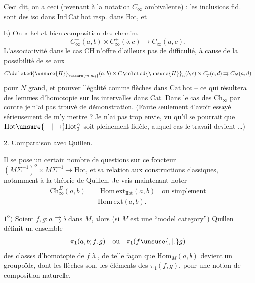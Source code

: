 Ceci dit, on a ceci (revenant à la notation $C_{\infty}$ ambivalente) :  les inclusions  fid.
sont des iso dans $\mathrm{Ind}\,\mathrm{Cat}\,\mathrm{hot}$ resp. dans $\mathrm{Hot}$, et

b) On a bel et bien  composition des chemins
\[
C_{\infty}^{-}(a,b)\times C_{\infty}^{+}(b,c)\longrightarrow C_{\infty}(a,c).
\]
L'\uline{associativité} dans le cas  $\mathrm{CH}$ n'offre d'ailleurs pas de difficulté, à cause de la possibilité de se   aux
\[
C\deleted{\unsure{H}}_{\unsure{m|m_1}}(a,b)\times C\deleted{\unsure{H}}_n(b,c)\times C_p(c,d)\rightrightarrows C_N(a,d)
\]
pour $N$ grand, et prouver l'égalité  comme flèches dans $\mathrm{Cat}\ \mathrm{hot}$ -- ce qui résultera des lemmes d'homotopie sur les intervalles dans $\mathrm{Cat}$. Dans le cas des $\mathrm{Ch}_{\infty}$ par contre je n'ai pas trouvé de démonstration. (Faute seulement d'avoir essayé sérieusement de m'y mettre ? Je n'ai pas trop envie, vu qu'il se pourrait que $\mathrm{Hot}\unsure{\text{---}|\to}\mathrm{Hot}_0^{\wedge}$ soit pleinement fidèle, auquel cas le travail devient  \ldots)

2. \uline{Comparaison avec} \uline{Quillen}.

 Il se pose un certain nombre de questions sur ce foncteur $(M\Sigma^{-1})^o\times M\Sigma^{-1}\longrightarrow\mathrm{Hot}$, et sa relation aux constructions classiques, notamment à la théorie de Quillen. Je vais maintenant noter
\[
\begin{aligned}
\mathrm{Ch}_{\infty}^{\Sigma}(a,b)&=\mathrm{Hom}\,\mathrm{ext}_{\mathrm{Hot}}(a,b)\quad\text{ou simplement}\\
&\quad\mathrm{Hom}\,\mathrm{ext}(a,b).
\end{aligned}
\]

$1^{\mathrm o})$ Soient $f,g:a\rightrightarrows b$ dans $M$, alors (si $M$ est une ``model category'') Quillen définit un ensemble
\[
\pi_1(a,b;f,g)\quad\text{ou}\quad\pi_1(f\unsure{,|.}g)
\]
des classes d'homotopie de $f$ à , de telle façon que $\mathrm{Hom}_{M}(a,b)$ devient  un groupoïde, dont les flèches sont les éléments des $\pi_1(f,g)$, pour une notion de composition naturelle.

